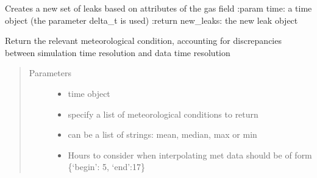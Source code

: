 \documentclass[letterpaper,10pt,english]{sphinxmanual}
\begin{document}
\begin{fulllineitems}
\begin{fulllineitems}
\begin{quote}
\begin{description}
\end{description}\end{quote}

\end{fulllineitems}


\begin{fulllineitems}
\label{\detokenize{index:feast.EmissionSimModules.infrastructure_classes.GasField.emission_size_maker}}
Creates a new set of leaks based on attributes of the gas field
:param time: a time object (the parameter delta\_t is used)
:return new\_leaks: the new leak object

\end{fulllineitems}


\begin{fulllineitems}
\label{\detokenize{index:feast.EmissionSimModules.infrastructure_classes.GasField.get_met}}
Return the relevant meteorological condition, accounting for discrepancies between simulation time resolution
and data time resolution
\begin{quote}\begin{description}
\item[{Parameters}] \leavevmode\begin{itemize}
\item {} 
 \textendash{} time object

\item {} 
 \textendash{} specify a list of meteorological conditions to return

\item {} 
 \textendash{} can be a list of strings: mean, median, max or min

\item {} 
 \textendash{} Hours to consider when interpolating met data should be of form \{‘begin’: 5, ‘end’:17\}


\end{itemize}
\end{description}
\end{quote}
\end{fulllineitems}
\end{fulllineitems}
\end{document}
